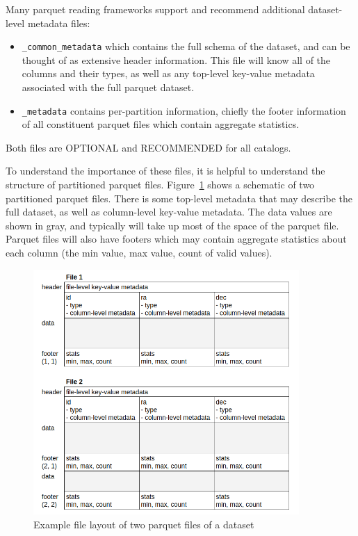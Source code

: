 \documentclass[11pt,a4paper]{ivoa}
\begin{document}
Many parquet reading frameworks support and recommend additional dataset-level metadata files:
\begin{itemize}
    \item \texttt{\_common\_metadata} which contains the full schema of the dataset, and can be thought of as extensive header information. 
    This file will know all of the columns and their types, as well as any top-level key-value metadata associated with the full parquet dataset.
    \item \texttt{\_metadata} contains per-partition information, chiefly the footer information of all constituent parquet files which contain aggregate statistics.
\end{itemize}

Both files are OPTIONAL and RECOMMENDED for all catalogs.

To understand the importance of these files, it is helpful to understand the structure of partitioned parquet files. 
Figure~\ref{fig:partitionedParquet} shows a schematic of two partitioned parquet files. 
There is some top-level metadata that may describe the full dataset, as well as column-level key-value metadata.
The data values are shown in gray, and typically will take up most of the space of the parquet file. 
Parquet files will also have footers which may contain aggregate statistics about each column (the min value, max value, count of valid values).

\begin{figure}
\centering
\includegraphics[width=0.9\textwidth]{leaf_files.png}
\caption{Example file layout of two parquet files of a dataset}
\label{fig:partitionedParquet}
\end{figure}
\end{document}
